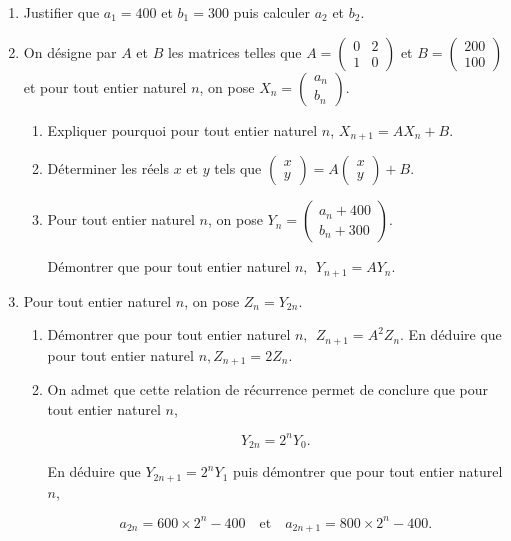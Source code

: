 \documentclass[10pt]{article}
\begin{document}
\begin{enumerate}
\item Justifier que $a_{1} = 400$ et $b_{1} = 300$ puis calculer $a_{2}$ et $b_{2}$. 
\item On désigne par $A$ et $B$ les matrices telles que $A = \begin{pmatrix}0&2\\1&0\end{pmatrix}$ et $B = \begin{pmatrix}200\\100\end{pmatrix}$ et pour tout entier naturel $n$, on pose $X_{n} = \begin{pmatrix}a_{n}\\b_{n}\end{pmatrix}$.
	\begin{enumerate}
		\item Expliquer pourquoi pour tout entier naturel $n$, $X_{n+1} = AX_{n} + B$.
		\item Déterminer les réels $x$ et $y$ tels que $\begin{pmatrix}x\\y\end{pmatrix} = A\begin{pmatrix}x\\y\end{pmatrix} + B$. 
		\item Pour tout entier naturel $n$, on pose $Y_{n} = \begin{pmatrix}a_{n} + 400\\ 
b_{n} + 300\end{pmatrix}$. 

Démontrer que pour tout entier naturel $n,\:\: Y_{n+1} = AY_{n}$. 
	\end{enumerate}
\item Pour tout entier naturel $n$, on pose $Z_{n} = Y_{2n}$. 
	\begin{enumerate}
		\item Démontrer que pour tout entier naturel $n,\:\: Z_{n+1} = A^2 Z_{n}$. En déduire que pour tout entier naturel $n, Z_{n+1} = 2Z_{n}$. 
		\item On admet que cette relation de récurrence permet de conclure que pour tout entier naturel $n$, 

\[Y_{2n} = 2^n Y_{0}.\] 

En déduire que $Y_{2n + 1} = 2^nY_{1}$ puis démontrer que pour tout entier naturel $n$, 

\[a_{2n} = 600 \times 2^n - 400\quad  \text{et}\quad  a_{2n+1} = 800 \times 2^n - 400.\]
 

\end{enumerate}
\end{enumerate}
\end{document}
